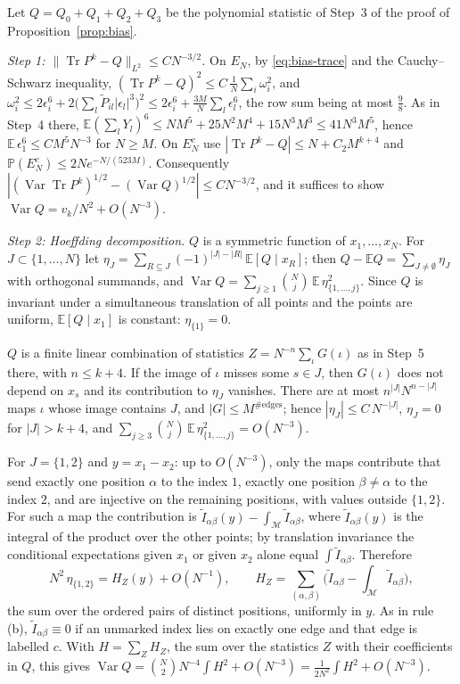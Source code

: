 \documentclass[11pt,a4paper]{article}
\makeatletter
\theoremstyle{stmt}
\theoremstyle{defn}
\theoremstyle{rmk}
\renewenvironment{proof}[1][\proofname]{\par\pushQED{\qed}\normalfont\topsep6\p@\@plus6\p@\relax
  \trivlist\item[\hskip\labelsep{\sffamily\itshape\small #1.}]\ignorespaces}{\popQED\endtrivlist\@endpefalse}
\numberwithin{equation}{section}
\DeclareMathOperator{\Tr}{Tr}
\newcommand{\M}{\mathcal{M}}
\makeatother
\begin{document}
{\begin{proof}
Let $Q=Q_0+Q_1+Q_2+Q_3$ be the polynomial statistic of Step~3 of the proof of Proposition~\ref{prop:bias}.

\emph{Step 1: $\|\Tr P^k-Q\|_{L^2}\le CN^{-3/2}$.} On $E_N$, by \eqref{eq:bias-trace} and the Cauchy--Schwarz inequality, $(\Tr P^k-Q)^2\le C\,\frac1N\sum_i\omega_i^2$, and $\omega_i^2\le2\epsilon_i^6+2\big(\sum_l\tilde P_{il}|\epsilon_l|^3\big)^2\le2\epsilon_i^6+\frac{3M}N\sum_l\epsilon_l^6$, the row sum being at most $\frac98$. As in Step~4 there, $\mathbb E(\sum_lY_l)^6\le NM^5+25N^2M^4+15N^3M^3\le41N^3M^5$, hence $\mathbb E\,\epsilon_1^6\le CM^5N^{-3}$ for $N\ge M$. On $E_N^c$ use $|\Tr P^k-Q|\le N+C_2M^{k+4}$ and $\mathbb P(E_N^c)\le2Ne^{-N/(523M)}$. Consequently $|(\operatorname{Var}\Tr P^k)^{1/2}-(\operatorname{Var}Q)^{1/2}|\le CN^{-3/2}$, and it suffices to show $\operatorname{Var}Q=v_k/N^2+O(N^{-3})$.

\emph{Step 2: Hoeffding decomposition.} $Q$ is a symmetric function of $x_1,\dots,x_N$. For $J\subset\{1,\dots,N\}$ let $\eta_J=\sum_{R\subseteq J}(-1)^{|J|-|R|}\,\mathbb E[Q\mid x_R]$; then $Q-\mathbb EQ=\sum_{J\ne\emptyset}\eta_J$ with orthogonal summands, and $\operatorname{Var}Q=\sum_{j\ge1}\binom Nj\,\mathbb E\,\eta_{\{1,\dots,j\}}^2$. Since $Q$ is invariant under a simultaneous translation of all points and the points are uniform, $\mathbb E[Q\mid x_1]$ is constant: $\eta_{\{1\}}=0$.

$Q$ is a finite linear combination of statistics $Z=N^{-n}\sum_\iota G(\iota)$ as in Step~5 there, with $n\le k+4$. If the image of $\iota$ misses some $s\in J$, then $G(\iota)$ does not depend on $x_s$ and its contribution to $\eta_J$ vanishes. There are at most $n^{|J|}N^{n-|J|}$ maps $\iota$ whose image contains $J$, and $|G|\le M^{\#\mathrm{edges}}$; hence $|\eta_J|\le C\,N^{-|J|}$, $\eta_J=0$ for $|J|>k+4$, and $\sum_{j\ge3}\binom Nj\,\mathbb E\,\eta_{\{1,\dots,j\}}^2=O(N^{-3})$.

For $J=\{1,2\}$ and $y=x_1-x_2$: up to $O(N^{-3})$, only the maps contribute that send exactly one position $\alpha$ to the index $1$, exactly one position $\beta\ne\alpha$ to the index $2$, and are injective on the remaining positions, with values outside $\{1,2\}$. For such a map the contribution is $\tilde I_{\alpha\beta}(y)-\int_\M\tilde I_{\alpha\beta}$, where $\tilde I_{\alpha\beta}(y)$ is the integral of the product over the other points; by translation invariance the conditional expectations given $x_1$ or given $x_2$ alone equal $\int\tilde I_{\alpha\beta}$. Therefore
\begin{equation}\label{eq:var-kernel}
N^2\,\eta_{\{1,2\}}=H_Z(y)+O(N^{-1}),\qquad H_Z=\sum_{(\alpha,\beta)}\Big(\tilde I_{\alpha\beta}-\int_\M\tilde I_{\alpha\beta}\Big),
\end{equation}
the sum over the ordered pairs of distinct positions, uniformly in $y$. As in rule (b), $\tilde I_{\alpha\beta}\equiv0$ if an unmarked index lies on exactly one edge and that edge is labelled $c$. With $H=\sum_ZH_Z$, the sum over the statistics $Z$ with their coefficients in $Q$, this gives $\operatorname{Var}Q=\binom N2N^{-4}\int H^2+O(N^{-3})=\frac1{2N^2}\int H^2+O(N^{-3})$.


\end{proof}}
\end{document}
